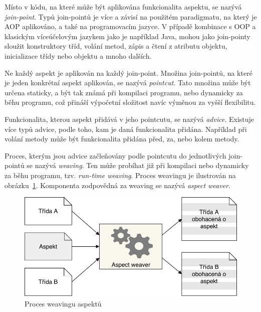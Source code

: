 Místo v kódu, na které může být aplikována funkcionalita aspektu, se nazývá
\textit{join-point}. Typů join-pointů je více a závisí na použitém paradigmatu,
na který je \gls{AOP} aplikováno, a také na programovacím jazyce. V případě
kombinace s \gls{OOP} a klasickým víceúčelovým jazykem jako je například Java,
mohou jako join-pointy sloužit konstruktory tříd, volání metod, zápis a čtení
z atributu objektu, inicializace třídy nebo objektu a mnoho dalších.

Ne každý aspekt je aplikován na každý join-point. Množina join-pointů,
na které je jeden konkrétní aspekt aplikován, se nazývá \textit{pointcut}.
Tato množina může být určena staticky, a být tak známá při kompilaci programu, nebo
dynamicky za běhu programu, což přináší výpočetní složitost navíc výměnou
za vyšší flexibilitu.

Funkcionalita, kterou aspekt přidává v jeho pointcutu, se nazývá
\textit{advice}. Existuje více typů advice, podle toho, kam je
daná funkcionalita přidána. Například při volání metody může
být funkcionalita přidána před, za, nebo kolem metody.

Proces, kterým jsou advice začleňovány podle pointcutu do
jednotlivých join-pointů se nazývá \textit{weaving}. Ten může
probíhat již při kompilaci nebo dynamicky za běhu programu,
tzv. \textit{run-time weaving}. Proces weavingu je ilustrován
na obrázku~\ref{fig:aspect-weaving}. Komponenta zodpovědná za
weaving se nazývá \textit{aspect weaver}.

\begin{figure}[t]
    \centering
    \includegraphics[keepaspectratio=true, width=0.7\linewidth]{figures/aspect-weaving.pdf}
    \caption{Proces weavingu aspektů}
    \label{fig:aspect-weaving}
\end{figure}

